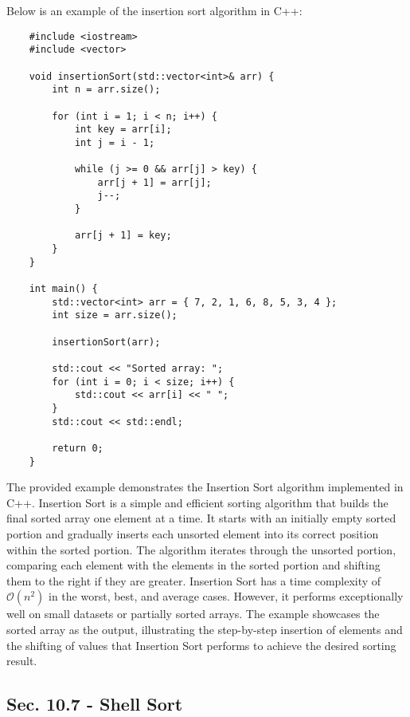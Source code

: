 \begin{solution}
    Below is an example of the insertion sort algorithm in C++:

    \horizontalline

    \begin{verbatim}
    #include <iostream>
    #include <vector>
    
    void insertionSort(std::vector<int>& arr) {
        int n = arr.size();
    
        for (int i = 1; i < n; i++) {
            int key = arr[i];
            int j = i - 1;
    
            while (j >= 0 && arr[j] > key) {
                arr[j + 1] = arr[j];
                j--;
            }
    
            arr[j + 1] = key;
        }
    }
    
    int main() {
        std::vector<int> arr = { 7, 2, 1, 6, 8, 5, 3, 4 };
        int size = arr.size();
    
        insertionSort(arr);
    
        std::cout << "Sorted array: ";
        for (int i = 0; i < size; i++) {
            std::cout << arr[i] << " ";
        }
        std::cout << std::endl;
    
        return 0;
    }
    \end{verbatim}

    \horizontalline

    The provided example demonstrates the Insertion Sort algorithm implemented in C++. Insertion Sort is a simple and efficient sorting algorithm that builds the final sorted array one element at a time. It starts with an initially empty sorted portion and gradually inserts each unsorted element into its correct position within the sorted portion. 
    The algorithm iterates through the unsorted portion, comparing each element with the elements in the sorted portion and shifting them to the right if they are greater. Insertion Sort has a time complexity of $\mathcal{O}(n^2)$ in the worst, best, and average cases. However, it performs exceptionally well on small datasets or partially 
    sorted arrays. The example showcases the sorted array as the output, illustrating the step-by-step insertion of elements and the shifting of values that Insertion Sort performs to achieve the desired sorting result.
\end{solution}

\subsection*{Sec. 10.7 - Shell Sort}

